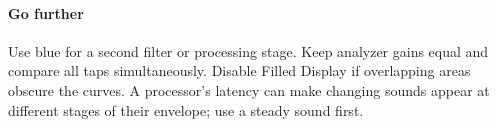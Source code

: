 \paragraph{Go further}
Use blue for a second filter or processing stage. Keep analyzer gains equal
and compare all taps simultaneously. Disable Filled Display if overlapping
areas obscure the curves. A processor's latency can make changing sounds
appear at different stages of their envelope; use a steady sound first.
